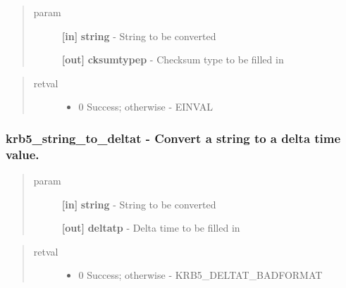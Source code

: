 \documentclass[letterpaper,10pt,english]{sphinxmanual}
\begin{document}
\begin{quote}\begin{description}
\item[{param}] \leavevmode
\textbf{{[}in{]}} \textbf{string} - String to be converted

\textbf{{[}out{]}} \textbf{cksumtypep} - Checksum type to be filled in

\end{description}\end{quote}
\begin{quote}\begin{description}
\item[{retval}] \leavevmode\begin{itemize}
\item {} 
0   Success; otherwise - EINVAL

\end{itemize}

\end{description}\end{quote}


\subsubsection{krb5\_string\_to\_deltat -  Convert a string to a delta time value.}
\label{appdev/refs/api/krb5_string_to_deltat::doc}\label{appdev/refs/api/krb5_string_to_deltat:krb5-string-to-deltat-convert-a-string-to-a-delta-time-value}

\begin{fulllineitems}
\label{appdev/refs/api/krb5_string_to_deltat:c.krb5_string_to_deltat}
\end{fulllineitems}

\begin{quote}\begin{description}
\item[{param}] \leavevmode
\textbf{{[}in{]}} \textbf{string} - String to be converted

\textbf{{[}out{]}} \textbf{deltatp} - Delta time to be filled in

\end{description}\end{quote}
\begin{quote}\begin{description}
\item[{retval}] \leavevmode\begin{itemize}
\item {} 
0   Success; otherwise - KRB5\_DELTAT\_BADFORMAT

\end{itemize}

\end{description}\end{quote}
\end{document}
